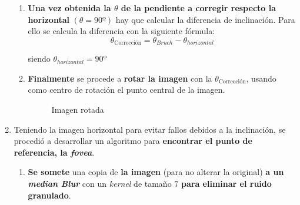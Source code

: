 \begin{enumerate}
\begin{enumerate}[label*=\arabic*.]
  \item \textbf{Una vez obtenida la $\theta$ de la pendiente a
      corregir respecto la horizontal} $\left( \theta = 90º \right)$
    hay que calcular la diferencia de inclinación. Para ello se
    calcula la diferencia con la siguiente fórmula:
    \begin{equation*}
      \theta_\text{Corrección} = \theta_{Bruch} - \theta_{horizontal}
    \end{equation*}
    \begin{center}
      siendo $\theta_{horizontal} = 90º$
    \end{center}
  \item \textbf{Finalmente} se procede a \textbf{rotar la imagen} con
    la $\theta_{\text{Corrección}}$, usando como centro de rotación el
    punto central de la imagen.

    \begin{figure}[H]
      \caption{Imagen rotada}
      \centering \setlength\fboxsep{0pt} \setlength\fboxrule{0.5pt}
    \end{figure}

  \end{enumerate}

\item Teniendo la imagen horizontal para evitar fallos debidos a la
  inclinación, se procedió a desarrollar un algoritmo para
  \textbf{encontrar el punto de referencia, la \emph{\gls{fovea}}}.
  \begin{enumerate}[label*=\arabic*.]
  \item \textbf{Se somete} una copia de \textbf{la imagen} (para no
    alterar la original) \textbf{a un \emph{median
        Blur}} con un \emph{kernel} de
    tamaño $7$ \textbf{para eliminar el ruido granulado}.


\end{enumerate}
\end{enumerate}
